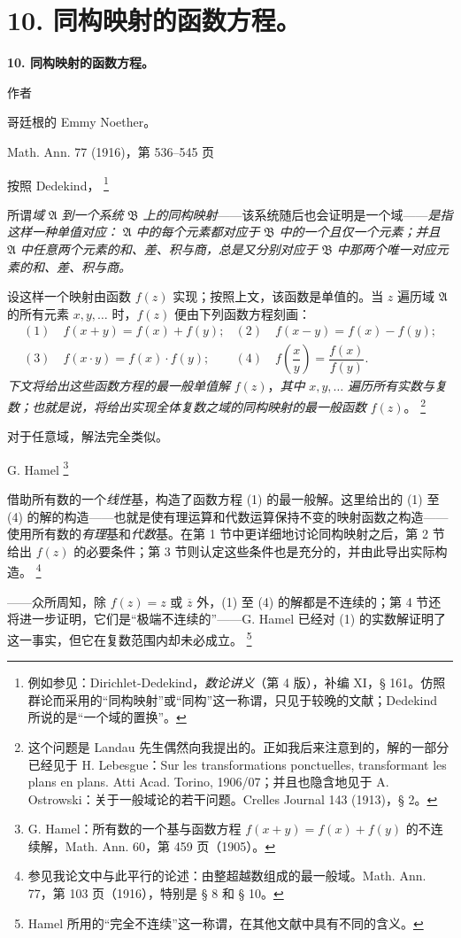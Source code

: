 \documentclass[11pt]{article}
\providecommand{\qtext}[1]{“#1”}
\providecommand{\Afield}{\mathfrak A}
\providecommand{\Bfield}{\mathfrak B}
\providecommand{\srcfn}[2]{%
  \begingroup\renewcommand{\thefootnote}{#1}\footnote{#2}\addtocounter{footnote}{-1}\endgroup}
\begin{document}
\setcounter{footnote}{0}
\section*{10. 同构映射的函数方程。}
\begin{center}
{\Large\bfseries 10. 同构映射的函数方程。}\par
\vspace{0.75em}
作者\par
\vspace{0.75em}
哥廷根的 Emmy Noether。\par
\vspace{1em}
Math. Ann. 77 (1916)，第 536--545 页
\end{center}

\vspace{3em}

按照 Dedekind，\srcfn{*)}{例如参见：Dirichlet-Dedekind，\emph{数论讲义}（第 4 版），补编 XI，§ 161。仿照群论而采用的\qtext{同构映射}或\qtext{同构}这一称谓，只见于较晚的文献；Dedekind 所说的是\qtext{一个域的置换}。}所谓\emph{域} \(\Afield\) \emph{到一个系统} \(\Bfield\) \emph{上的同构映射}——该系统随后也会证明是一个域——\emph{是指这样一种单值对应：} \(\Afield\) \emph{中的每个元素都对应于} \(\Bfield\) \emph{中的一个且仅一个元素；并且} \(\Afield\) \emph{中任意两个元素的和、差、积与商，总是又分别对应于} \(\Bfield\) \emph{中那两个唯一对应元素的和、差、积与商。}

设这样一个映射由函数 \(f(z)\) 实现；按照上文，该函数是单值的。当 \(z\) 遍历域 \(\Afield\) 的所有元素 \(x,y,\ldots\) 时，\(f(z)\) 便由下列函数方程刻画：
\[
\begin{array}{ll}
(1)\quad f(x+y)=f(x)+f(y); & (2)\quad f(x-y)=f(x)-f(y);\\[0.45em]
(3)\quad f(x\cdot y)=f(x)\cdot f(y); & (4)\quad f\!\left(\dfrac{x}{y}\right)=\dfrac{f(x)}{f(y)}.
\end{array}
\]
\emph{下文将给出这些函数方程的最一般单值解} \(f(z)\)，\emph{其中} \(x,y,\ldots\) \emph{遍历所有实数与复数；也就是说，将给出实现全体复数之域的同构映射的最一般函数} \(f(z)\)。\srcfn{**)}{这个问题是 Landau 先生偶然向我提出的。正如我后来注意到的，解的一部分已经见于 H. Lebesgue：Sur les transformations ponctuelles, transformant les plans en plans. Atti Acad. Torino, 1906/07；并且也隐含地见于 A. Ostrowski：关于一般域论的若干问题。Crelles Journal 143 (1913)，§ 2。}对于任意域，解法完全类似。

G. Hamel\srcfn{*)}{G. Hamel：所有数的一个基与函数方程 \(f(x+y)=f(x)+f(y)\) 的不连续解，Math. Ann. 60，第 459 页（1905）。}借助所有数的一个\emph{线性}基，构造了函数方程 (1) 的最一般解。这里给出的 (1) 至 (4) 的解的构造——也就是使有理运算和代数运算保持不变的映射函数之构造——使用所有数的\emph{有理}基和\emph{代数}基。在第 1 节中更详细地讨论同构映射之后，第 2 节给出 \(f(z)\) 的必要条件；第 3 节则认定这些条件也是充分的，并由此导出实际构造。\srcfn{**)}{参见我论文中与此平行的论述：由整超越数组成的最一般域。Math. Ann. 77，第 103 页（1916），特别是 § 8 和 § 10。}——众所周知，除 \(f(z)=z\) 或 \(\overline z\) 外，(1) 至 (4) 的解都是不连续的；第 4 节还将进一步证明，它们是\qtext{极端不连续的}——G. Hamel 已经对 (1) 的实数解证明了这一事实，但它在复数范围内却未必成立。\srcfn{***)}{Hamel 所用的\qtext{完全不连续}这一称谓，在其他文献中具有不同的含义。}
\end{document}
